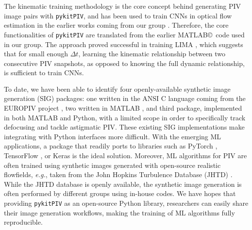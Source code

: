 \documentclass[a4paper,fleqn]{cas-dc}
\begin{document}
The kinematic training methodology \cite{manickathan2022kinematic} is the core concept behind generating PIV image pairs with \texttt{pykitPIV}, and has been used to train CNNs in optical flow estimation in the earlier works coming from our group \cite{manickathan2022kinematic, manickathan2023lightweight, mucignat2023lightweight}. 
Therefore, the core functionalities of \texttt{pykitPIV} are translated from the earlier MATLAB\copyright \, code used in our group.
The approach proved successful in training LIMA \cite{manickathan2022kinematic}, which suggests that for small enough $\Delta t$, learning the kinematic relationship between two consecutive PIV snapshots, as opposed to knowing the full dynamic relationship, is sufficient to train CNNs.

To date, we have been able to identify four openly-available synthetic image generation (SIG) packages: one written in the ANSI C language coming from the EUROPIV project \cite{lecordier2004europiv}, two written in MATLAB \citep{ben2020openpiv, mendes2020piv}, and third package, implemented in both MATLAB and Python, with a limited scope in order to specifically track defocusing and tackle astigmatic PIV. These existing SIG implementations make integrating with Python interfaces more difficult. With the emerging ML applications, a package that readily ports to libraries such as PyTorch \cite{paszke2017automatic, paszke2019pytorch}, TensorFlow \cite{tensorflow2015}, or Keras \cite{chollet2015keras} is the ideal solution. Moreover, ML algorithms for PIV are often trained using synthetic images generated with open-source realistic flowfields, \textit{e.g.}, taken from the John Hopkins Turbulence Database (JHTD) \cite{perlman2007data}. While the JHTD database is openly available, the synthetic image generation is often performed by different groups using in-house codes. We have hopes that providing \texttt{pykitPIV} as an open-source Python library, researchers can easily share their image generation workflows, making the training of ML algorithms fully reproducible.
\end{document}
